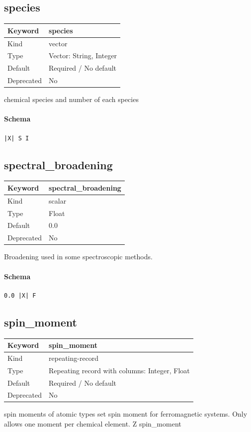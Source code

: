 \documentclass[11pt]{article}
\begin{document}
\subsection{species}
\label{kw:species}
\begin{longtable}{|p{1.5in}|p{4.5in}|}
\hline
Keyword & species \\
\hline
Kind & vector \\
\hline
Type & Vector: String, Integer \\
\hline
Default & Required / No default \\
\hline
Deprecated & No \\
\hline
\end{longtable}
 chemical species and number of each species

\paragraph{Schema}
\begin{Verbatim}
|X| S I
\end{Verbatim}

\subsection{spectral\_broadening}
\label{kw:spectral-broadening}
\begin{longtable}{|p{1.5in}|p{4.5in}|}
\hline
Keyword & spectral\_broadening \\
\hline
Kind & scalar \\
\hline
Type & Float \\
\hline
Default & 0.0 \\
\hline
Deprecated & No \\
\hline
\end{longtable}
 Broadening used in some spectroscopic methods.

\paragraph{Schema}
\begin{Verbatim}
0.0 |X| F
\end{Verbatim}

\subsection{spin\_moment}
\label{kw:spin-moment}
\begin{longtable}{|p{1.5in}|p{4.5in}|}
\hline
Keyword & spin\_moment \\
\hline
Kind & repeating-record \\
\hline
Type & Repeating record with columns: Integer, Float \\
\hline
Default & Required / No default \\
\hline
Deprecated & No \\
\hline
\end{longtable}
 spin moments of atomic types
 set spin moment for ferromagnetic systems.
 Only allows one moment per chemical element.
 Z spin\_moment
\end{document}
